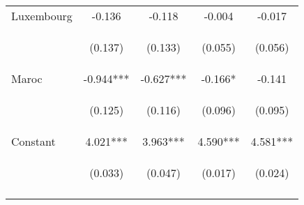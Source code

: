 \begin{center}
\begin{tabular}{lcccc}
Luxembourg & -0.136 & -0.118 & -0.004 & -0.017 \\
\vspace{4pt} & \begin{footnotesize}(0.137)\end{footnotesize} & \begin{footnotesize}(0.133)\end{footnotesize} & \begin{footnotesize}(0.055)\end{footnotesize} & \begin{footnotesize}(0.056)\end{footnotesize} \\
Maroc & -0.944*** & -0.627*** & -0.166* & -0.141 \\
\vspace{4pt} & \begin{footnotesize}(0.125)\end{footnotesize} & \begin{footnotesize}(0.116)\end{footnotesize} & \begin{footnotesize}(0.096)\end{footnotesize} & \begin{footnotesize}(0.095)\end{footnotesize} \\
Constant & 4.021*** & 3.963*** & 4.590*** & 4.581*** \\
 & \begin{footnotesize}(0.033)\end{footnotesize} & \begin{footnotesize}(0.047)\end{footnotesize} & \begin{footnotesize}(0.017)\end{footnotesize} & \begin{footnotesize}(0.024)\end{footnotesize} \\
\vspace{4pt} & \begin{footnotesize}\end{footnotesize} & \begin{footnotesize}\end{footnotesize} & \begin{footnotesize}\end{footnotesize} & \begin{footnotesize}\end{footnotesize} \\

\end{tabular}
\end{center}
